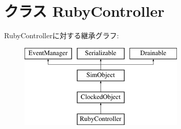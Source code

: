 \hypertarget{classController_1_1RubyController}{
\section{クラス RubyController}
\label{classController_1_1RubyController}
}
RubyControllerに対する継承グラフ:\begin{figure}[H]
\begin{center}
\leavevmode
\includegraphics[height=4cm]{classController_1_1RubyController}
\end{center}
\end{figure}
